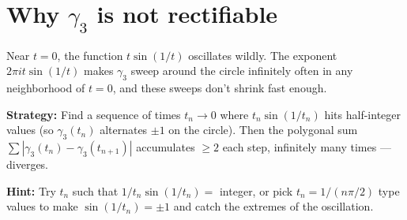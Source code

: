 \documentclass[12pt]{article}
\begin{document}
\section*{Why $\gamma_3$ is not rectifiable}
Near $t = 0$, the function $t \sin(1/t)$ oscillates wildly. The exponent $2\pi i t \sin(1/t)$ makes $\gamma_3$ sweep around the circle infinitely often in any neighborhood of $t = 0$, and these sweeps don't shrink fast enough.

\begin{center}
\end{center}

\textbf{Strategy:} Find a sequence of times $t_n \to 0$ where $t_n \sin(1/t_n)$ hits half-integer values (so $\gamma_3(t_n)$ alternates $\pm 1$ on the circle). Then the polygonal sum $\sum |\gamma_3(t_n) - \gamma_3(t_{n+1})|$ accumulates $\geq 2$ each step, infinitely many times --- diverges.

\textbf{Hint:} Try $t_n$ such that $1/t_n \sin(1/t_n) = $ integer, or pick $t_n = 1/(n\pi/2)$ type values to make $\sin(1/t_n) = \pm 1$ and catch the extremes of the oscillation.
\end{document}
